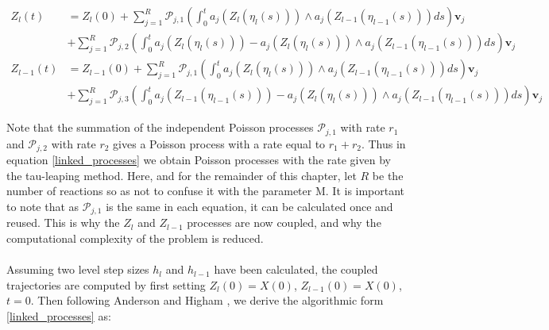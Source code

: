 \documentclass[ugrad,lot,lof,openright,11pt,oneside,onehalfspace]{RUthesis}
\begin{document}
		\begin{equation}\label{linked_processes}
		\begin{split}
		Z_l(t) & = Z_l(0) + \sum\limits_{j=1}^R \mathcal{P}_{j,1} \left( \int_0^t a_j( Z_l(\eta_l(s))) \wedge a_j(Z_{l-1}(\eta_{l-1}(s)))ds \right) \mathbf{v}_j
		\\
		& + \sum\limits_{j=1}^R \mathcal{P}_{j,2} \left( \int_0^t a_j( Z_l(\eta_l(s))) - a_j( Z_l(\eta_l(s))) \wedge a_j(Z_{l-1}(\eta_{l-1}(s)))ds \right) \mathbf{v}_j
		\\
		Z_{l-1}(t) & = Z_{l-1}(0) + \sum\limits_{j=1}^R \mathcal{P}_{j,1} \left( \int_0^t a_j( Z_l(\eta_l(s))) \wedge a_j(Z_{l-1}(\eta_{l-1}(s)))ds \right) \mathbf{v}_j
		\\
		& + \sum\limits_{j=1}^R \mathcal{P}_{j,3} \left( \int_0^t a_j( Z_{l-1}(\eta_{l-1}(s))) - a_j( Z_l(\eta_l(s))) \wedge a_j(Z_{l-1}(\eta_{l-1}(s)))ds \right) \mathbf{v}_j
		\end{split}
		\end{equation}

		\noindent
		Note that the summation of the independent Poisson processes $\mathcal{P}_{j,1}$ with rate $r_1$ and $\mathcal{P}_{j,2}$ with rate $r_2$ gives a Poisson process with a rate equal to $r_1+r_2$. Thus in equation \eqref{linked_processes} we obtain Poisson processes with the rate given by the tau-leaping method. Here, and for the remainder of this chapter, let $R$ be the number of reactions so as not to confuse it with the parameter M. It is important to note that as $\mathcal{P}_{j,1}$ is the same in each equation, it can be calculated once and reused. This is why the $Z_l$ and $Z_{l-1}$ processes are now coupled, and why the computational complexity of the problem is reduced.\\
		\\
		Assuming two level step sizes $h_l$ and $h_{l-1}$ have been calculated, the coupled trajectories are computed by first setting $Z_l(0) = X(0)$, $Z_{l-1}(0) = X(0)$, $t = 0$. Then following Anderson and Higham \cite{mlmc_applications}, we derive the algorithmic form \eqref{linked_processes} as:
\end{document}

